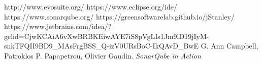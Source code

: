 \documentclass[runningheads]{llncs}
\begin{document}
 








\newpage

\begin{thebibliography}{8}

 {http://www.evosuite.org/}
 {https://www.eclipse.org/ide/}
 {https://www.sonarqube.org/}
 {https://greensoftwarelab.github.io/jStanley/}
 {https://www.jetbrains.com/idea/?gclid=CjwKCAiA6vXwBRBKEiwAYE7iS8pVgLIs1Jm9lD19jIyM-snkTFQII9BD9\_MAsFrgBSS\_Q-izV0URsBoC-IkQAvD\_BwE}
G. Ann Campbell, Patroklos P. Papapetrou, Olivier Gaudin.\textit{  SonarQube in Action}

\end{thebibliography}
\end{document}
